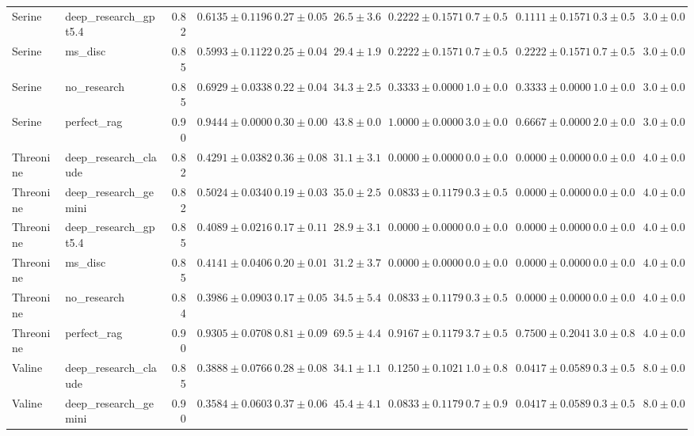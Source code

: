 \begin{table}[htbp]
\begin{tabular}{llrrrrrrrrr}
Serine & deep_research_gpt5.4 & 0.82 & $0.6135 \pm 0.1196$ & $0.27 \pm 0.05$ & $26.5 \pm 3.6$ & $0.2222 \pm 0.1571$ & $0.7 \pm 0.5$ & $0.1111 \pm 0.1571$ & $0.3 \pm 0.5$ & $3.0 \pm 0.0$ \\
Serine & ms_disc & 0.85 & \cellcolor{red!25}$0.5993 \pm 0.1122$ & $0.25 \pm 0.04$ & $29.4 \pm 1.9$ & $0.2222 \pm 0.1571$ & $0.7 \pm 0.5$ & $0.2222 \pm 0.1571$ & $0.7 \pm 0.5$ & $3.0 \pm 0.0$ \\
Serine & no_research & 0.85 & $0.6929 \pm 0.0338$ & $0.22 \pm 0.04$ & $34.3 \pm 2.5$ & $0.3333 \pm 0.0000$ & $1.0 \pm 0.0$ & $0.3333 \pm 0.0000$ & $1.0 \pm 0.0$ & $3.0 \pm 0.0$ \\
Serine & perfect_rag & 0.90 & \cellcolor{green!25}$0.9444 \pm 0.0000$ & $0.30 \pm 0.00$ & $43.8 \pm 0.0$ & $1.0000 \pm 0.0000$ & $3.0 \pm 0.0$ & $0.6667 \pm 0.0000$ & $2.0 \pm 0.0$ & $3.0 \pm 0.0$ \\
\midrule
Threonine & deep_research_claude & 0.82 & $0.4291 \pm 0.0382$ & $0.36 \pm 0.08$ & $31.1 \pm 3.1$ & $0.0000 \pm 0.0000$ & $0.0 \pm 0.0$ & $0.0000 \pm 0.0000$ & $0.0 \pm 0.0$ & $4.0 \pm 0.0$ \\
Threonine & deep_research_gemini & 0.82 & $0.5024 \pm 0.0340$ & $0.19 \pm 0.03$ & $35.0 \pm 2.5$ & $0.0833 \pm 0.1179$ & $0.3 \pm 0.5$ & $0.0000 \pm 0.0000$ & $0.0 \pm 0.0$ & $4.0 \pm 0.0$ \\
Threonine & deep_research_gpt5.4 & 0.85 & $0.4089 \pm 0.0216$ & $0.17 \pm 0.11$ & $28.9 \pm 3.1$ & $0.0000 \pm 0.0000$ & $0.0 \pm 0.0$ & $0.0000 \pm 0.0000$ & $0.0 \pm 0.0$ & $4.0 \pm 0.0$ \\
Threonine & ms_disc & 0.85 & $0.4141 \pm 0.0406$ & $0.20 \pm 0.01$ & $31.2 \pm 3.7$ & $0.0000 \pm 0.0000$ & $0.0 \pm 0.0$ & $0.0000 \pm 0.0000$ & $0.0 \pm 0.0$ & $4.0 \pm 0.0$ \\
Threonine & no_research & 0.84 & \cellcolor{red!25}$0.3986 \pm 0.0903$ & $0.17 \pm 0.05$ & $34.5 \pm 5.4$ & $0.0833 \pm 0.1179$ & $0.3 \pm 0.5$ & $0.0000 \pm 0.0000$ & $0.0 \pm 0.0$ & $4.0 \pm 0.0$ \\
Threonine & perfect_rag & 0.90 & \cellcolor{green!25}$0.9305 \pm 0.0708$ & $0.81 \pm 0.09$ & $69.5 \pm 4.4$ & $0.9167 \pm 0.1179$ & $3.7 \pm 0.5$ & $0.7500 \pm 0.2041$ & $3.0 \pm 0.8$ & $4.0 \pm 0.0$ \\
\midrule
Valine & deep_research_claude & 0.85 & $0.3888 \pm 0.0766$ & $0.28 \pm 0.08$ & $34.1 \pm 1.1$ & $0.1250 \pm 0.1021$ & $1.0 \pm 0.8$ & $0.0417 \pm 0.0589$ & $0.3 \pm 0.5$ & $8.0 \pm 0.0$ \\
Valine & deep_research_gemini & 0.90 & $0.3584 \pm 0.0603$ & $0.37 \pm 0.06$ & $45.4 \pm 4.1$ & $0.0833 \pm 0.1179$ & $0.7 \pm 0.9$ & $0.0417 \pm 0.0589$ & $0.3 \pm 0.5$ & $8.0 \pm 0.0$ \\

\end{tabular}
\end{table}
